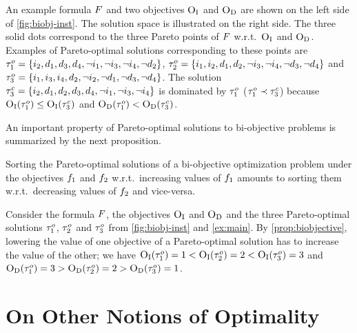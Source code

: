 \begin{example}\label{ex:main}
  An example formula $F$ and two objectives $\textsc{O}_{\text{I}}$ and $\textsc{O}_{\text{D}}$ are shown on the left side of \cref{fig:biobj-inst}. 
  The solution space is illustrated on the right side.
  The three solid dots correspond to the three Pareto points of $F$ w.r.t.\ $\textsc{O}_{\text{I}}$ and $\textsc{O}_{\text{D}}$. 
  Examples of Pareto-optimal solutions corresponding to these points are $\tau^o_1 = \{i_2,\allowbreak d_1,\allowbreak d_3,\allowbreak d_4,\allowbreak \lnot i_1,\allowbreak \lnot i_3,\allowbreak \lnot i_4,\allowbreak \lnot d_2\}$, $\tau^o_2 = \{i_1,\allowbreak i_2,\allowbreak d_1,\allowbreak d_2,\allowbreak \lnot i_3,\allowbreak \lnot i_4,\allowbreak \lnot d_3,\allowbreak \lnot d_4\}$ and $\tau^o_3 = \{i_1,\allowbreak i_3,\allowbreak i_4,\allowbreak d_2,\allowbreak \lnot i_2,\allowbreak \lnot d_1,\allowbreak \lnot d_3,\allowbreak \lnot d_4\}$.
  The solution $\tau^c_3 = \{i_2,\allowbreak d_1,\allowbreak d_2,\allowbreak d_3,\allowbreak d_4,\allowbreak \lnot i_1,\allowbreak \lnot i_3,\allowbreak \lnot i_4\}$ is dominated by $\tau^o_1$ ($\tau^o_1 \prec \tau^c_3$) because $\textsc{O}_{\text{I}}(\tau^o_1) \leq \textsc{O}_{\text{I}}(\tau^c_3)$ and $\textsc{O}_{\text{D}}(\tau^o_1) < \textsc{O}_{\text{D}}(\tau^c_3)$. \\
\end{example}

An important property of Pareto-optimal solutions to bi-objective problems is summarized by the next proposition.
\begin{observation} \label{prop:biobjective}
  Sorting the Pareto-optimal solutions of a bi-objective optimization problem under the objectives $f_1$ and $f_2$ w.r.t.\ increasing values of $f_1$ amounts to sorting them w.r.t.\ decreasing values of $f_2$ and vice-versa.
\end{observation}

\begin{example}
  Consider the formula $F$, the objectives $\textsc{O}_{\text{I}}$ and $\textsc{O}_{\text{D}}$ and the three Pareto-optimal solutions $\tau^o_1$, $\tau^o_2$ and $\tau^o_3$ from \cref{fig:biobj-inst} and \cref{ex:main}.
  By \cref{prop:biobjective}, lowering the value of one objective of a Pareto-optimal solution has to increase the value of the other;
  we have $\textsc{O}_{\text{I}}(\tau^o_1) = 1 < \textsc{O}_{\text{I}}(\tau^o_2) = 2 < \textsc{O}_{\text{I}}(\tau^o_3) = 3$ and $\textsc{O}_{\text{D}}(\tau^o_1) = 3 > \textsc{O}_{\text{D}}(\tau^o_2) = 2 > \textsc{O}_{\text{D}}(\tau^o_3) = 1$.
\end{example}

\section{On Other Notions of Optimality\label{sec:other-notions}}

